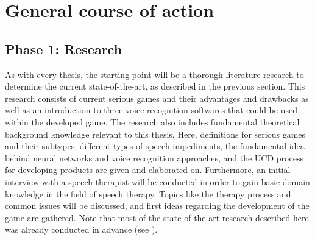 \documentclass[draft,final]{vutinfth} %
\begin{document}
\section{General course of action}
\label{chap:coa}
\subsection{Phase 1: Research}
As with every thesis, the starting point will be a thorough literature research to determine the current state-of-the-art, as described in the previous section. This research consists of current serious games and their advantages and drawbacks as well as an introduction to three voice recognition softwares that could be used within the developed game. The research also includes fundamental theoretical background knowledge relevant to this thesis. Here, definitions for serious games and their subtypes, different types of speech impediments, the fundamental idea behind neural networks and voice recognition approaches, and the UCD process for developing products are given and elaborated on. Furthermore, an initial interview with a speech therapist will be conducted in order to gain basic domain knowledge in the field of speech therapy. Topics like the therapy process and common issues will be discussed, and first ideas regarding the development of the game are gathered. Note that most of the state-of-the-art research described here was already conducted in advance (see \cite{LEPaper}). 
\end{document}
